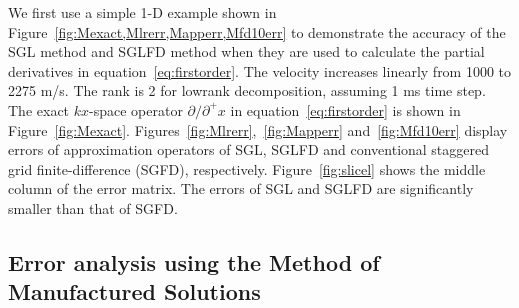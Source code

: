 We first use a simple 1-D example shown in Figure~\ref{fig:Mexact,Mlrerr,Mapperr,Mfd10err} to demonstrate the accuracy of the SGL method and SGLFD method when they are used to calculate the partial derivatives in equation~\ref{eq:firstorder}. The velocity increases linearly from 1000 to 2275 m/s. The rank is 2 for lowrank decomposition, assuming 1 ms time step. The exact $kx$-space operator $\partial/\partial^+x$ in equation~\ref{eq:firstorder} is shown in Figure~\ref{fig:Mexact}. Figures~\ref{fig:Mlrerr},~\ref{fig:Mapperr} and~\ref{fig:Mfd10err} display errors of approximation operators of SGL, SGLFD and conventional staggered grid finite-difference (SGFD), respectively. Figure~\ref{fig:slicel} shows the middle column of the error matrix. The errors of SGL and SGLFD are significantly smaller than that of SGFD. 



\subsection{Error analysis using the Method of Manufactured Solutions}

